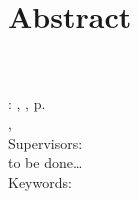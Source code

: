 \chapter*{Abstract}
\thispagestyle{empty}


\myName\\
\myTitle\\
\myLocation : \myUni , \myTime , \pageref{LastPage} p.\\
\myDegree , \mySubject\\
Supervisors: \mySupervisor\\

\noindent
to be done\ldots \\

\noindent
Keywords: \myKeywords